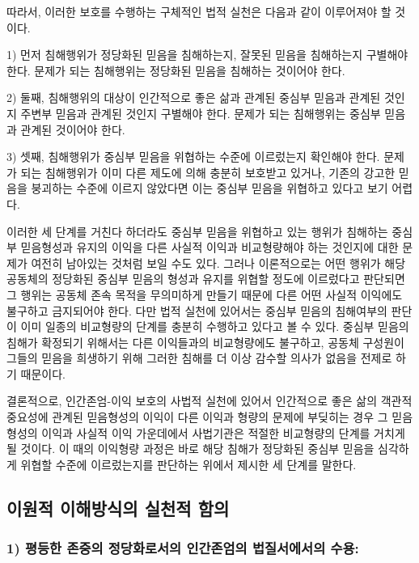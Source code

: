 따라서, 이러한 보호를 수행하는 구체적인 법적 실천은 다음과 같이 이루어져야 할 것이다.

1) 먼저 침해행위가 정당화된 믿음을 침해하는지, 잘못된 믿음을 침해하는지 구별해야 한다. 문제가 되는 침해행위는 정당화된 믿음을 침해하는 것이어야 한다.

2) 둘째, 침해행위의 대상이 인간적으로 좋은 삶과 관계된 중심부 믿음과 관계된 것인지 주변부 믿음과 관계된 것인지 구별해야 한다. 문제가 되는 침해행위는 중심부 믿음과 관계된 것이어야 한다.

3) 셋째, 침해행위가 중심부 믿음을 위협하는 수준에 이르렀는지 확인해야 한다. 문제가 되는 침해행위가 이미 다른 제도에 의해 충분히 보호받고 있거나, 기존의 강고한 믿음을 붕괴하는 수준에 이르지 않았다면 이는 중심부 믿음을 위협하고 있다고 보기 어렵다.

이러한 세 단계를 거친다 하더라도 중심부 믿음을 위협하고 있는 행위가 침해하는 중심부 믿음형성과 유지의 이익을 다른 사실적 이익과 비교형량해야 하는 것인지에 대한 문제가 여전히 남아있는 것처럼 보일 수도 있다. 그러나 이론적으로는 어떤 행위가 해당 공동체의 정당화된 중심부 믿음의 형성과 유지를 위협할 정도에 이르렀다고 판단되면 그 행위는 공동체 존속 목적을 무의미하게 만들기 때문에 다른 어떤 사실적 이익에도 불구하고 금지되어야 한다. 다만 법적 실천에 있어서는 중심부 믿음의 침해여부의 판단이 이미 일종의 비교형량의 단계를 충분히 수행하고 있다고 볼 수 있다. 중심부 믿음의 침해가 확정되기 위해서는 다른 이익들과의 비교형량에도 불구하고, 공동체 구성원이 그들의 믿음을 희생하기 위해 그러한 침해를 더 이상 감수할 의사가 없음을 전제로 하기 때문이다.

결론적으로, 인간존엄-이익 보호의 사법적 실천에 있어서 인간적으로 좋은 삶의 객관적 중요성에 관계된 믿음형성의 이익이 다른 이익과 형량의 문제에 부딪히는 경우 그 믿음형성의 이익과 사실적 이익 가운데에서 사법기관은 적절한 비교형량의 단계를 거치게 될 것이다. 이 때의 이익형량 과정은 바로 해당 침해가 정당화된 중심부 믿음을 심각하게 위협할 수준에 이르렀는지를 판단하는 위에서 제시한 세 단계를 말한다.

\subsection{이원적 이해방식의 실천적 함의}

\subsubsection{\texorpdfstring{1) 평등한 존중의 정당화로서의 인간존엄의 법질서에서의 수용: }{1) 평등한 존중의 정당화로서의 인간존엄의 법질서에서의 수용: }}

